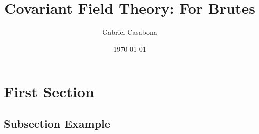 \documentclass{beamer}
\title[Covariant Field Theory]{Covariant Field Theory: For Brutes} %
\author{Gabriel Casabona} %
\institute[Northwestern] %
{
Northwestern University \\ %
\medskip
\textit{Electromagnetism PHY 414} \\ %
\medskip
Thesis Adviser: Shane Larson, Ph.D.
}
\date{\today} %
\begin{document}
\begin{frame}
\titlepage %
\end{frame}



\section{First Section} %

\subsection{Subsection Example} %


\end{document}
